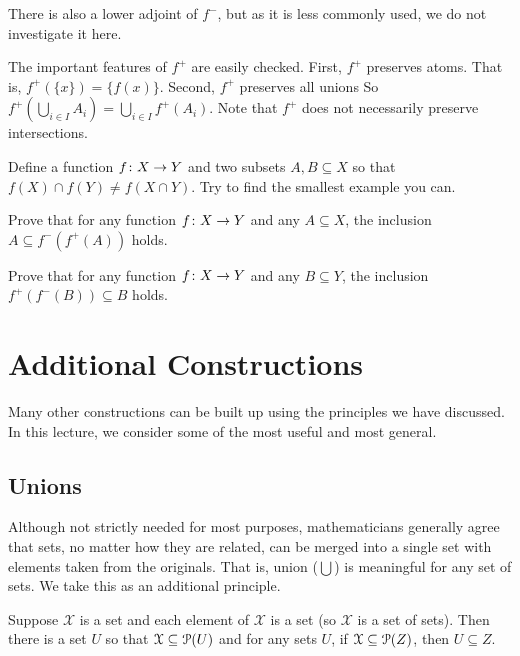 There is also a lower adjoint of $f^-$, but as it is less commonly used, we do not investigate it here.

The important features of $f^+$ are easily checked. 
First, $f^+$ preserves atoms.
That is, $f^+(\{x\}) = \{f(x)\}$. 
Second, $f^+$ preserves all unions So $f^+(\bigcup_{i\in I}A_i) = \bigcup_{i\in I}f^+(A_i)$. Note that $f^+$ does not necessarily preserve intersections.

\begin{exercises}
	\begin{nextexercise}
		\item Define a function ${f}\colon{X}\to{Y}$ and two subsets $A,B\subseteq X$ so that $f(X)\cap f(Y) \neq f(X\cap Y)$. Try to find the smallest example you can.
		\item Prove that for any function ${f}\colon{X}\to{Y}$ and any $A\subseteq X$, the inclusion $A\subseteq f^-(f^+(A))$ holds.
		\item Prove that for any function ${f}\colon{X}\to{Y}$ and any $B\subseteq Y$, the inclusion $f^+(f^-(B))\subseteq B$ holds.
	\end{nextexercise}
\end{exercises}

\chapter{Additional Constructions}


\begin{goals}
	
\end{goals}
Many other constructions can be built up using the principles we have discussed. 
In this lecture, we consider some of the most useful and most general.

\section{Unions}

Although not strictly needed for most purposes, mathematicians generally agree that sets, no matter how they are related, can be merged into a single set with elements taken from the originals. 
That is, union ($\bigcup$) is meaningful for any set of sets. We take this as an additional principle.

\begin{principle}
	Suppose $\mathcal X$ is a set and each element of $\mathcal X$ is a set (so $\mathcal X$ is a set of sets).
	Then there is a set $U$ so that $\mathcal X\subseteq {\mathcal{P}}(U)$ and 
	for any sets $U$, if $\mathcal X\subseteq{\mathcal{P}}(Z)$, then $U\subseteq Z$.
\end{principle}

